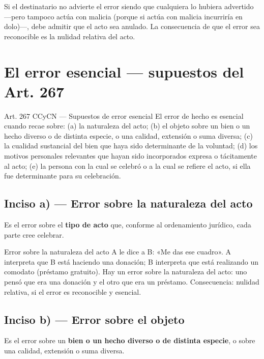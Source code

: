 \documentclass[12pt,oneside]{book}
\begin{document}
Si el destinatario no advierte el error siendo que cualquiera lo hubiera advertido ---pero tampoco actúa con malicia (porque si actúa con malicia incurriría en dolo)---, debe admitir que el acto sea anulado. La consecuencia de que el error sea reconocible es la nulidad relativa del acto.

\section{El error esencial --- supuestos del Art. 267}

\begin{articulo}{Art. 267 CCyCN --- Supuestos de error esencial}
El error de hecho es esencial cuando recae sobre: (a) la naturaleza del acto; (b) el objeto sobre un bien o un hecho diverso o de distinta especie, o una calidad, extensión o suma diversa; (c) la cualidad sustancial del bien que haya sido determinante de la voluntad; (d) los motivos personales relevantes que hayan sido incorporados expresa o tácitamente al acto; (e) la persona con la cual se celebró o a la cual se refiere el acto, si ella fue determinante para su celebración.
\end{articulo}

\subsection{Inciso a) --- Error sobre la naturaleza del acto}

Es el error sobre el \textbf{tipo de acto} que, conforme al ordenamiento jurídico, cada parte cree celebrar.

\begin{example}{Error sobre la naturaleza del acto}
A le dice a B: «Me das ese cuadro». A interpreta que B está haciendo una donación; B interpreta que está realizando un comodato (préstamo gratuito). Hay un error sobre la naturaleza del acto: uno pensó que era una donación y el otro que era un préstamo. Consecuencia: nulidad relativa, si el error es reconocible y esencial.
\end{example}

\subsection{Inciso b) --- Error sobre el objeto}

Es el error sobre un \textbf{bien o un hecho diverso o de distinta especie}, o sobre una calidad, extensión o suma diversa.
\end{document}
